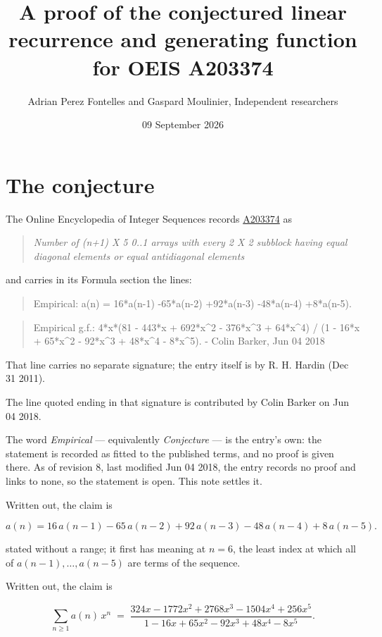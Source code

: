 \documentclass[11pt]{article}
\title{A proof of the conjectured linear recurrence and generating function for OEIS A203374}
\author{Adrian Perez Fontelles and Gaspard Moulinier, Independent researchers}
\date{09 September 2026}
\theoremstyle{definition}
\begin{document}
\maketitle
\section{The conjecture}

The Online Encyclopedia of Integer Sequences records \href{https://oeis.org/A203374}{A203374} as

\begin{quote}\itshape Number of (n+1) X 5 0..1 arrays with every 2 X 2 subblock having equal diagonal elements or equal antidiagonal elements\end{quote}

and carries in its Formula section the lines:

\begin{quote}\ttfamily Empirical: a(n) = 16*a(n-1) -65*a(n-2) +92*a(n-3) -48*a(n-4) +8*a(n-5).\end{quote}

\begin{quote}\ttfamily Empirical g.f.: 4*x*(81 - 443*x + 692*x\textasciicircum{}2 - 376*x\textasciicircum{}3 + 64*x\textasciicircum{}4) / (1 - 16*x + 65*x\textasciicircum{}2 - 92*x\textasciicircum{}3 + 48*x\textasciicircum{}4 - 8*x\textasciicircum{}5). - Colin Barker, Jun 04 2018\end{quote}

That line carries no separate signature; the entry itself is by R. H. Hardin (Dec 31 2011).

The line quoted ending in that signature is contributed by Colin Barker on Jun 04 2018.

The word {\itshape Empirical} --- equivalently {\itshape Conjecture} --- is the entry's own: the statement is recorded as fitted to the published terms, and no proof is given there. As of revision 8, last modified Jun 04 2018, the entry records no proof and links to none, so the statement is open. This note settles it.

Written out, the claim is

\[a(n) = 16\,a(n-1) - 65\,a(n-2) + 92\,a(n-3) - 48\,a(n-4) + 8\,a(n-5).\]

stated without a range; it first has meaning at $n = 6$, the least index at which all of $a(n-1),\dots,a(n-5)$ are terms of the sequence.

Written out, the claim is

\[\sum_{n \ge 1} a(n)\,x^n \;=\; \frac{324x - 1772x^{2} + 2768x^{3} - 1504x^{4} + 256x^{5}}{1 - 16x + 65x^{2} - 92x^{3} + 48x^{4} - 8x^{5}}.\]
\end{document}
